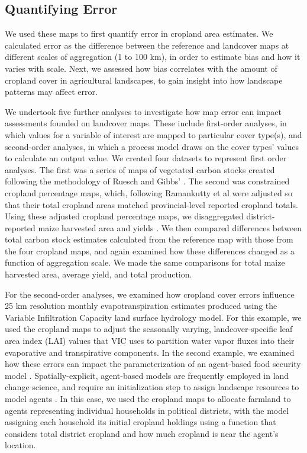 \documentclass{pnastwo}
\begin{document}
\begin{article}
\vspace{-0.5 cm}
\section{Quantifying Error}
We used these maps to first quantify error in cropland area estimates. We calculated error as the difference between the reference and landcover maps at different scales of aggregation (1 to 100 km), in order to estimate bias and how it varies with scale. Next, we assessed how bias correlates with the amount of cropland cover in agricultural landscapes, to gain insight into how landscape patterns may affect error.    

We undertook five further analyses to investigate how map error can impact assessments founded on landcover maps. These include first-order analyses, in which values for a variable of interest are mapped to particular cover type(s), and second-order analyses, in which a process model draws on the cover types' values to calculate an output value. We created four datasets to represent first order analyses. The first was a series of maps of vegetated carbon stocks created following the methodology of Ruesch and Gibbs' \cite{ruesch_new_2008}. The second was constrained cropland percentage maps, which, following Ramankutty et al \cite{ramankutty_farming_2008} were adjusted so that their total cropland areas matched provincial-level reported cropland totals. Using these adjusted cropland percentage maps, we disaggregated district-reported maize harvested area and yields \cite[following][]{monfreda_farming_2008} . We then compared differences between total carbon stock estimates calculated from the reference map with those from the four cropland maps, and again examined how these differences changed as a function of aggregation scale.  We made the same comparisons for total maize harvested area, average yield, and total production. 

For the second-order analyses, we examined how cropland cover errors influence 25 km resolution monthly evapotranspiration estimates produced using the Variable Infiltration Capacity \cite{liang_simple_1994} land surface hydrology model. For this example, we used the cropland maps to adjust the seasonally varying, landcover-specific leaf area index (LAI) values that VIC uses to partition water vapor fluxes into their evaporative and transpirative components. In the second example, we examined how these errors can impact the parameterization of an agent-based food security model \cite{chen_dependency_2013}. Spatially-explicit, agent-based models are frequently employed in land change science, and require an initialization step to assign landscape resources to model agents  \cite[e.g.][]{manson_agent-based_2007,evans_multi-scale_2004,kelley_relative_2011}. In this case, we used the cropland maps to allocate farmland to agents representing individual households in political districts, with the model assigning each household its initial cropland holdings using a function that considers total district cropland and how much cropland is near the agent's location.  


\end{article}
\end{document}
